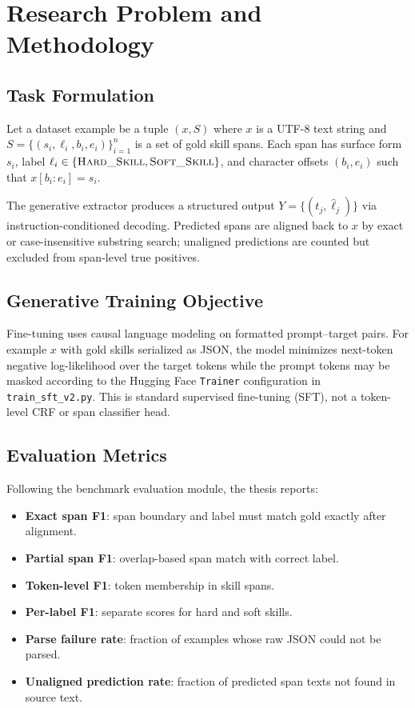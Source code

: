 \chapter{Research Problem and Methodology}
\label{ch:methodology}

\section{Task Formulation}

Let a dataset example be a tuple $(x, S)$ where $x$ is a UTF-8 text string and $S = \{(s_i, \ell_i, b_i, e_i)\}_{i=1}^{n}$ is a set of gold skill spans.
Each span has surface form $s_i$, label $\ell_i \in \{\textsc{Hard\_Skill}, \textsc{Soft\_Skill}\}$, and character offsets $(b_i, e_i)$ such that $x[b_i:e_i] = s_i$.

The generative extractor produces a structured output $Y = \{(t_j, \hat{\ell}_j)\}$ via instruction-conditioned decoding.
Predicted spans are aligned back to $x$ by exact or case-insensitive substring search; unaligned predictions are counted but excluded from span-level true positives.

\section{Generative Training Objective}

Fine-tuning uses causal language modeling on formatted prompt--target pairs.
For example $x$ with gold skills serialized as JSON, the model minimizes next-token negative log-likelihood over the target tokens while the prompt tokens may be masked according to the Hugging Face \texttt{Trainer} configuration in \texttt{train\_sft\_v2.py}.
This is standard supervised fine-tuning (SFT), not a token-level CRF or span classifier head.

\section{Evaluation Metrics}

Following the benchmark evaluation module, the thesis reports:

\begin{itemize}
  \item \textbf{Exact span F1}: span boundary and label must match gold exactly after alignment.
  \item \textbf{Partial span F1}: overlap-based span match with correct label.
  \item \textbf{Token-level F1}: token membership in skill spans.
  \item \textbf{Per-label F1}: separate scores for hard and soft skills.
  \item \textbf{Parse failure rate}: fraction of examples whose raw JSON could not be parsed.
  \item \textbf{Unaligned prediction rate}: fraction of predicted span texts not found in source text.
\end{itemize}

